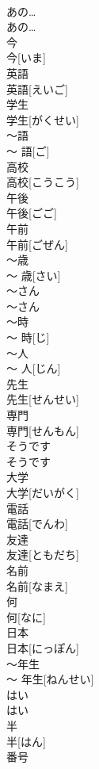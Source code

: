 \documentclass[8pt]{extreport}
\begin{document}
\begin{CJK}{UTF8}{min}
\\	あの…	
\\	あの…
\\	今	
\\	今[いま]
\\	英語	
\\	英語[えいご]
\\	学生	
\\	学生[がくせい]
\\	〜語	
\\	〜 語[ご]
\\	高校	
\\	高校[こうこう]
\\	午後	
\\	午後[ごご]
\\	午前	
\\	午前[ごぜん]
\\	〜歳	
\\	〜 歳[さい]
\\	〜さん	
\\	〜さん
\\	〜時	
\\	〜 時[じ]
\\	〜人	
\\	〜 人[じん]
\\	先生	
\\	先生[せんせい]
\\	専門	
\\	専門[せんもん]
\\	そうです	
\\	そうです
\\	大学	
\\	大学[だいがく]
\\	電話	
\\	電話[でんわ]
\\	友達	
\\	友達[ともだち]
\\	名前	
\\	名前[なまえ]
\\	何	
\\	何[なに]
\\	日本	
\\	日本[にっぽん]
\\	〜年生	
\\	〜 年生[ねんせい]
\\	はい	
\\	はい
\\	半	
\\	半[はん]
\\	番号	

\end{CJK}
\end{document}
